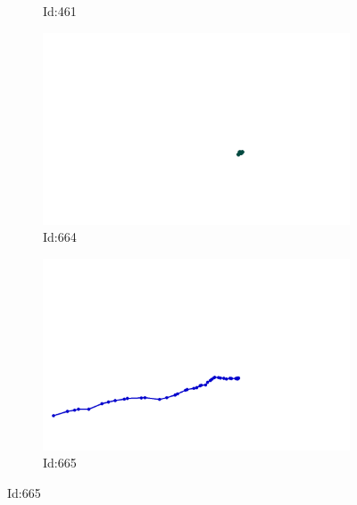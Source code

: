 \documentclass[12pt,twoside]{report}
\begin{document}
\begin{figure}
\begin{subfigure}[b]{0.20\textwidth}
\caption{Id:461}
\end{subfigure}
\begin{subfigure}[b]{0.20\textwidth}
\centering
\includegraphics[width=\textwidth]{../../trajectories/664.png}
\caption{Id:664}
\end{subfigure}
\begin{subfigure}[b]{0.20\textwidth}
\centering
\includegraphics[width=\textwidth]{../../trajectories/665.png}
\caption{Id:665}
\end{subfigure}
\end{figure}
\end{document}

